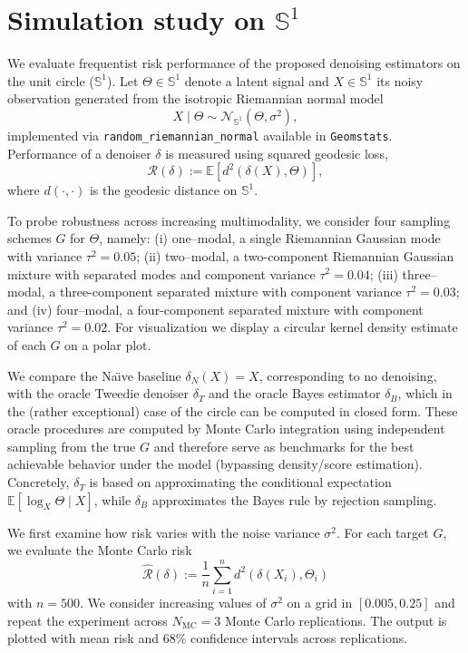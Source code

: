\documentclass{article}
\begin{document}
\section{Simulation study on $\mathbb{S}^1$}

We evaluate frequentist risk performance of the proposed denoising estimators on the unit circle ($\mathbb{S}^1$). Let $\Theta \in \mathbb{S}^1$ denote a latent signal and $X \in \mathbb{S}^1$ its noisy observation generated from the isotropic Riemannian normal model
\[
X \mid \Theta \sim \mathcal{N}_{\mathbb{S}^1}\!\left(\Theta,\sigma^2\right),
\]
implemented via \texttt{random\_riemannian\_normal} available in \texttt{Geomstats}. Performance of a denoiser $\delta$ is measured using squared geodesic loss,
\[
\mathcal{R}(\delta) := \mathbb{E}\!\left[d^2\!\left(\delta(X),\Theta\right)\right],
\]
where $d(\cdot,\cdot)$ is the geodesic distance on $\mathbb{S}^1$.

To probe robustness across increasing multimodality, we consider four sampling schemes $G$ for $\Theta$,
namely: (i) one--modal, a single Riemannian Gaussian mode with variance $\tau^2=0.05$; (ii) two--modal, a two-component Riemannian Gaussian mixture with separated modes and component variance $\tau^2=0.04$; (iii) three--modal, a three-component separated mixture with component variance $\tau^2=0.03$; and (iv) four--modal, a four-component separated mixture with component variance $\tau^2=0.02$.
For visualization we display a circular kernel density estimate of each $G$ on a polar plot.

We compare the Na\"{\i}ve baseline $\delta_N(X)=X$, corresponding to no denoising, with the oracle Tweedie denoiser $\delta_T$ and the oracle Bayes estimator $\delta_B$, which in the (rather exceptional) case of the circle can be computed in closed form. These oracle procedures are computed by Monte Carlo integration using independent sampling from the true $G$ and therefore serve as benchmarks for the best achievable behavior under the model (bypassing density/score estimation). Concretely, $\delta_T$ is based on approximating the conditional expectation $\mathbb{E}[\log_X \Theta \mid X]$, while $\delta_B$ approximates the Bayes rule by rejection sampling.

We first examine how risk varies with the noise variance $\sigma^2$. For each target $G$, we evaluate the Monte Carlo risk
\[
\widehat{\mathcal{R}}(\delta) := \frac{1}{n}\sum_{i=1}^n d^2\!\left(\delta(X_i),\Theta_i\right)
\]
with $n=500$. We consider increasing values of $\sigma^2$ on a grid in $[0.005,0.25]$ and repeat the experiment across $N_{\mathrm{MC}}=3$ Monte Carlo replications. The output is plotted with mean risk and 68\% confidence intervals across replications.
\end{document}
